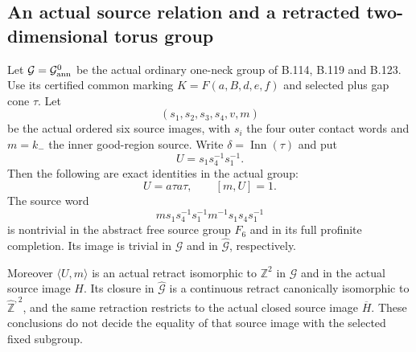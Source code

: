 \subsection*{An actual source relation and a retracted two-dimensional torus group}

\label{stmt:B130}
Let $\mathcal G=\mathcal G^0_{\rm ann}$ be the actual ordinary
one-neck group of B.114, B.119 and B.123. Use its certified common
marking $K=F(a,B,d,e,f)$ and selected plus gap cone $\tau$.
Let
\[
 (s_1,s_2,s_3,s_4,v,m)
\]
be the actual ordered six source images, with $s_i$ the four
outer contact words and $m=k_-$ the inner good-region source.
Write $\delta=\operatorname{Inn}(\tau)$ and put
\begin{equation}\label{eq:B130-U}
 U=s_1s_4^{-1}s_1^{-1}.
\end{equation}
Then the following are exact identities in the actual group:
\begin{equation}\label{eq:B130-actual-relation}
 U=a\tau a\tau,\qquad [m,U]=1.
\end{equation}
The source word
\begin{equation}\label{eq:B130-source-word}
 m s_1s_4^{-1}s_1^{-1}m^{-1}s_1s_4s_1^{-1}
\end{equation}
is nontrivial in the abstract free source group $F_6$ and in its
full profinite completion. Its image is trivial in $\mathcal G$
and in $\widehat{\mathcal G}$, respectively.

Moreover $\langle U,m\rangle$ is an actual retract isomorphic to
$\mathbb Z^2$ in $\mathcal G$ and in the actual source image $H$.
Its closure in $\widehat{\mathcal G}$ is a continuous retract
canonically isomorphic to $\widehat{\mathbb Z}^{,2}$, and the
same retraction restricts to the actual closed source image
$\overline H$. These conclusions do not decide the equality
of that source image with the selected fixed subgroup.

